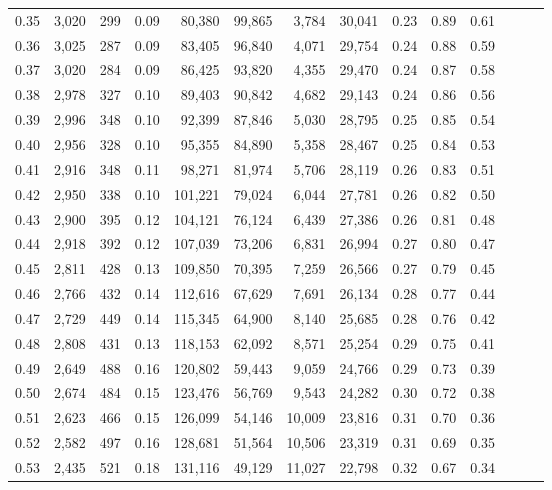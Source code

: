 \begin{tabular}{rrrrrrrrrrrrrr}
0.35 &  3,020 &  299 &  0.09 &   80,380 &   99,865 &   3,784 &  30,041 &  0.23 &  0.89 &      0.61 \\
0.36 &  3,025 &  287 &  0.09 &   83,405 &   96,840 &   4,071 &  29,754 &  0.24 &  0.88 &      0.59 \\
0.37 &  3,020 &  284 &  0.09 &   86,425 &   93,820 &   4,355 &  29,470 &  0.24 &  0.87 &      0.58 \\
0.38 &  2,978 &  327 &  0.10 &   89,403 &   90,842 &   4,682 &  29,143 &  0.24 &  0.86 &      0.56 \\
0.39 &  2,996 &  348 &  0.10 &   92,399 &   87,846 &   5,030 &  28,795 &  0.25 &  0.85 &      0.54 \\
0.40 &  2,956 &  328 &  0.10 &   95,355 &   84,890 &   5,358 &  28,467 &  0.25 &  0.84 &      0.53 \\
0.41 &  2,916 &  348 &  0.11 &   98,271 &   81,974 &   5,706 &  28,119 &  0.26 &  0.83 &      0.51 \\
0.42 &  2,950 &  338 &  0.10 &  101,221 &   79,024 &   6,044 &  27,781 &  0.26 &  0.82 &      0.50 \\
0.43 &  2,900 &  395 &  0.12 &  104,121 &   76,124 &   6,439 &  27,386 &  0.26 &  0.81 &      0.48 \\
0.44 &  2,918 &  392 &  0.12 &  107,039 &   73,206 &   6,831 &  26,994 &  0.27 &  0.80 &      0.47 \\
0.45 &  2,811 &  428 &  0.13 &  109,850 &   70,395 &   7,259 &  26,566 &  0.27 &  0.79 &      0.45 \\
0.46 &  2,766 &  432 &  0.14 &  112,616 &   67,629 &   7,691 &  26,134 &  0.28 &  0.77 &      0.44 \\
0.47 &  2,729 &  449 &  0.14 &  115,345 &   64,900 &   8,140 &  25,685 &  0.28 &  0.76 &      0.42 \\
0.48 &  2,808 &  431 &  0.13 &  118,153 &   62,092 &   8,571 &  25,254 &  0.29 &  0.75 &      0.41 \\
0.49 &  2,649 &  488 &  0.16 &  120,802 &   59,443 &   9,059 &  24,766 &  0.29 &  0.73 &      0.39 \\
0.50 &  2,674 &  484 &  0.15 &  123,476 &   56,769 &   9,543 &  24,282 &  0.30 &  0.72 &      0.38 \\
0.51 &  2,623 &  466 &  0.15 &  126,099 &   54,146 &  10,009 &  23,816 &  0.31 &  0.70 &      0.36 \\
0.52 &  2,582 &  497 &  0.16 &  128,681 &   51,564 &  10,506 &  23,319 &  0.31 &  0.69 &      0.35 \\
0.53 &  2,435 &  521 &  0.18 &  131,116 &   49,129 &  11,027 &  22,798 &  0.32 &  0.67 &      0.34 \\

\end{tabular}
